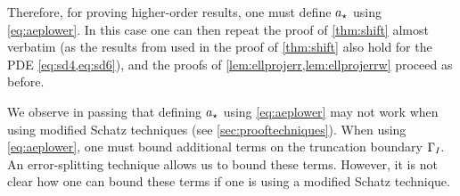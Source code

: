 Therefore, for proving higher-order results, one must define $a_{\star}$ using \cref{eq:aeplower}. In this case one can then repeat the proof of \cref{thm:shift} almost verbatim (as the results from \cite{Mc:00} used in the proof of \cref{thm:shift} also hold for the PDE \cref{eq:sd4,eq:sd6}), and the proofs of \cref{lem:ellprojerr,lem:ellprojerrw} proceed as before.

We observe in passing that defining $a_{\star}$ using \cref{eq:aeplower} may not work when using modified Schatz techniques (see \cref{sec:prooftechniques}). When using \cref{eq:aeplower}, one must bound additional terms on the truncation boundary $\Gamma_{I}.$ An error-splitting technique allows us to bound these terms. However, it is not clear how one can bound these terms if one is using a modified Schatz technique.
\ere



